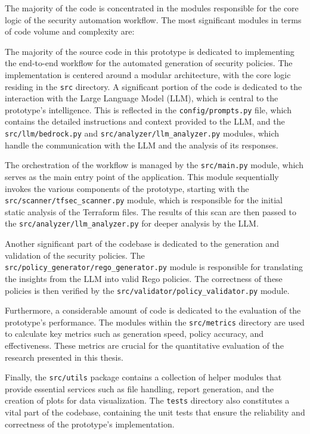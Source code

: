 The majority of the code is concentrated in the modules responsible for the core logic of the security automation workflow. The most significant modules in terms of code volume and complexity are:

The majority of the source code in this prototype is dedicated to implementing the end-to-end workflow for the automated generation of security policies. The implementation is centered around a modular architecture, with the core logic residing in the \texttt{src} directory. A significant portion of the code is dedicated to the interaction with the Large Language Model (LLM), which is central to the prototype's intelligence. This is reflected in the \texttt{config/prompts.py} file, which contains the detailed instructions and context provided to the LLM, and the \texttt{src/llm/bedrock.py} and \texttt{src/analyzer/llm\_analyzer.py} modules, which handle the communication with the LLM and the analysis of its responses.

The orchestration of the workflow is managed by the \texttt{src/main.py} module, which serves as the main entry point of the application. This module sequentially invokes the various components of the prototype, starting with the \texttt{src/scanner/tfsec\_scanner.py} module, which is responsible for the initial static analysis of the Terraform files. The results of this scan are then passed to the \texttt{src/analyzer/llm\_analyzer.py} for deeper analysis by the LLM.

Another significant part of the codebase is dedicated to the generation and validation of the security policies. The \texttt{src/policy\_generator/rego\_generator.py} module is responsible for translating the insights from the LLM into valid Rego policies. The correctness of these policies is then verified by the \texttt{src/validator/policy\_validator.py} module.

Furthermore, a considerable amount of code is dedicated to the evaluation of the prototype's performance. The modules within the \texttt{src/metrics} directory are used to calculate key metrics such as generation speed, policy accuracy, and effectiveness. These metrics are crucial for the quantitative evaluation of the research presented in this thesis.

Finally, the \texttt{src/utils} package contains a collection of helper modules that provide essential services such as file handling, report generation, and the creation of plots for data visualization. The \texttt{tests} directory also constitutes a vital part of the codebase, containing the unit tests that ensure the reliability and correctness of the prototype's implementation.

